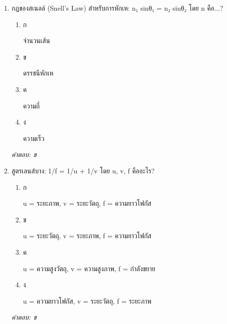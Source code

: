 \documentclass[12pt]{article}
\begin{document}
\begin{enumerate}[label=\arabic*., itemsep=0.5\baselineskip, topsep=0.5\baselineskip, leftmargin=*]
\item กฎของสเนลล์ (Snell's Law) สำหรับการหักเห: n₁ sinθ₁ = n₂ sinθ₂ โดย n คือ...?
\begin{enumerate}[label=\alph*)., itemsep=0.3\baselineskip, topsep=0.3\baselineskip]
\item ก\ 
\begin{minipage}[t]{0.9\linewidth}
\raggedright จำนวนเส้น
\end{minipage}
\item ข\ 
\begin{minipage}[t]{0.9\linewidth}
\raggedright ดรรชนีหักเห
\end{minipage}
\item ค\ 
\begin{minipage}[t]{0.9\linewidth}
\raggedright ความถี่
\end{minipage}
\item ง\ 
\begin{minipage}[t]{0.9\linewidth}
\raggedright ความเร็ว
\end{minipage}
\end{enumerate}
\vspace{-0.3\baselineskip}
\begin{small}
\textit{คำตอบ: ข}
\end{small}

\item สูตรเลนส์บาง: 1/f = 1/u + 1/v โดย u, v, f คืออะไร?
\begin{enumerate}[label=\alph*)., itemsep=0.3\baselineskip, topsep=0.3\baselineskip]
\item ก\ 
\begin{minipage}[t]{0.9\linewidth}
\raggedright u = ระยะภาพ, v = ระยะวัตถุ, f = ความยาวโฟกัส
\end{minipage}
\item ข\ 
\begin{minipage}[t]{0.9\linewidth}
\raggedright u = ระยะวัตถุ, v = ระยะภาพ, f = ความยาวโฟกัส
\end{minipage}
\item ค\ 
\begin{minipage}[t]{0.9\linewidth}
\raggedright u = ความสูงวัตถุ, v = ความสูงภาพ, f = กำลังขยาย
\end{minipage}
\item ง\ 
\begin{minipage}[t]{0.9\linewidth}
\raggedright u = ความยาวโฟกัส, v = ระยะวัตถุ, f = ระยะภาพ
\end{minipage}
\end{enumerate}
\vspace{-0.3\baselineskip}
\begin{small}
\textit{คำตอบ: ข}
\end{small}


\end{enumerate}
\end{document}
